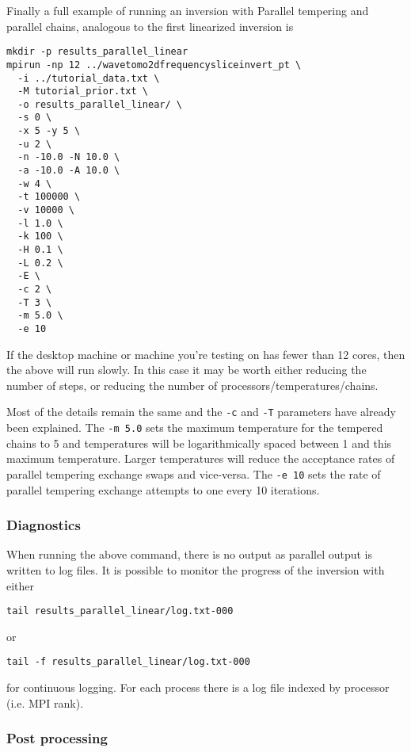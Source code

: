 \documentclass[a4paper,12pt]{article}
\begin{document}
Finally a full example of running an inversion with Parallel tempering and
parallel chains, analogous to the first linearized inversion is

\begin{verbatim}
mkdir -p results_parallel_linear
mpirun -np 12 ../wavetomo2dfrequencysliceinvert_pt \
  -i ../tutorial_data.txt \
  -M tutorial_prior.txt \
  -o results_parallel_linear/ \
  -s 0 \
  -x 5 -y 5 \
  -u 2 \
  -n -10.0 -N 10.0 \
  -a -10.0 -A 10.0 \
  -w 4 \
  -t 100000 \
  -v 10000 \
  -l 1.0 \
  -k 100 \
  -H 0.1 \
  -L 0.2 \
  -E \
  -c 2 \
  -T 3 \
  -m 5.0 \
  -e 10  
\end{verbatim}

If the desktop machine or machine you're testing on has fewer than 12 cores, then
the above will run slowly. In this case it may be worth either reducing the
number of steps, or reducing the number of processors/temperatures/chains.

Most of the details remain the same and the {\tt -c} and {\tt -T} parameters have
already been explained. The {\tt -m 5.0} sets the maximum temperature for the
tempered chains to 5 and temperatures will be logarithmically spaced between 1
and this maximum temperature. Larger temperatures will reduce the acceptance
rates of parallel tempering exchange swaps and vice-versa. The {\tt -e 10}
sets the rate of parallel tempering exchange attempts to one every 10 iterations.

\subsubsection{Diagnostics}

When running the above command, there is no output as parallel output is
written to log files. It is possible to monitor the progress of the inversion
with either

\begin{verbatim}
tail results_parallel_linear/log.txt-000
\end{verbatim}

or

\begin{verbatim}
tail -f results_parallel_linear/log.txt-000
\end{verbatim}

for continuous logging. For each process there is a log file indexed by processor
(i.e. MPI rank).


\subsubsection{Post processing}
\end{document}
